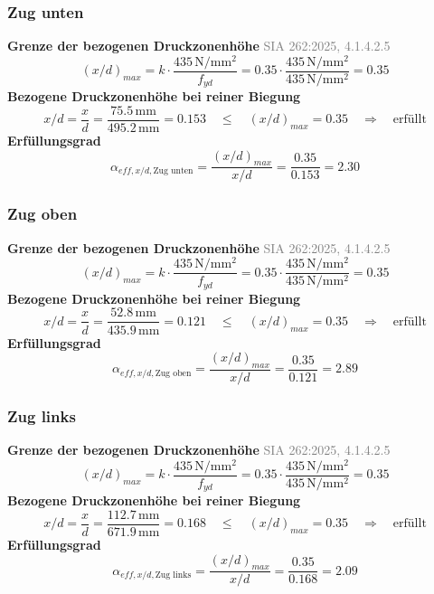 \documentclass[11pt,a4paper]{article}
\newcommand{\normref}[1]{{\small\textcolor{gray}{#1}}}
\begin{document}
\subsubsection{Zug unten}
\noindent\textbf{Grenze der bezogenen Druckzonenhöhe} \hfill \normref{SIA 262:2025, 4.1.4.2.5}
\begin{equation*}
\left(x/d\right)_{max} = k \cdot \frac{435\,\mathrm{N/mm^2}}{f_{yd}} = 0.35 \cdot \frac{435\,\mathrm{N/mm^2}}{435\,\mathrm{N}/\mathrm{mm}^{2}} = 0.35
\end{equation*}
\noindent\textbf{Bezogene Druckzonenhöhe bei reiner Biegung}
\begin{equation*}
x/d = \frac{x}{d} = \frac{75.5\,\mathrm{mm}}{495.2\,\mathrm{mm}} = 0.153 \quad \le \quad \left(x/d\right)_{max} = 0.35 \quad \Rightarrow \quad \text{erfüllt}
\end{equation*}
\noindent\textbf{Erfüllungsgrad}
\begin{equation*}
\alpha_{eff,x/d,\text{Zug unten}} = \frac{\left(x/d\right)_{max}}{x/d} = \frac{0.35}{0.153} = 2.30
\end{equation*}
\subsubsection{Zug oben}
\noindent\textbf{Grenze der bezogenen Druckzonenhöhe} \hfill \normref{SIA 262:2025, 4.1.4.2.5}
\begin{equation*}
\left(x/d\right)_{max} = k \cdot \frac{435\,\mathrm{N/mm^2}}{f_{yd}} = 0.35 \cdot \frac{435\,\mathrm{N/mm^2}}{435\,\mathrm{N}/\mathrm{mm}^{2}} = 0.35
\end{equation*}
\noindent\textbf{Bezogene Druckzonenhöhe bei reiner Biegung}
\begin{equation*}
x/d = \frac{x}{d} = \frac{52.8\,\mathrm{mm}}{435.9\,\mathrm{mm}} = 0.121 \quad \le \quad \left(x/d\right)_{max} = 0.35 \quad \Rightarrow \quad \text{erfüllt}
\end{equation*}
\noindent\textbf{Erfüllungsgrad}
\begin{equation*}
\alpha_{eff,x/d,\text{Zug oben}} = \frac{\left(x/d\right)_{max}}{x/d} = \frac{0.35}{0.121} = 2.89
\end{equation*}
\subsubsection{Zug links}
\noindent\textbf{Grenze der bezogenen Druckzonenhöhe} \hfill \normref{SIA 262:2025, 4.1.4.2.5}
\begin{equation*}
\left(x/d\right)_{max} = k \cdot \frac{435\,\mathrm{N/mm^2}}{f_{yd}} = 0.35 \cdot \frac{435\,\mathrm{N/mm^2}}{435\,\mathrm{N}/\mathrm{mm}^{2}} = 0.35
\end{equation*}
\noindent\textbf{Bezogene Druckzonenhöhe bei reiner Biegung}
\begin{equation*}
x/d = \frac{x}{d} = \frac{112.7\,\mathrm{mm}}{671.9\,\mathrm{mm}} = 0.168 \quad \le \quad \left(x/d\right)_{max} = 0.35 \quad \Rightarrow \quad \text{erfüllt}
\end{equation*}
\noindent\textbf{Erfüllungsgrad}
\begin{equation*}
\alpha_{eff,x/d,\text{Zug links}} = \frac{\left(x/d\right)_{max}}{x/d} = \frac{0.35}{0.168} = 2.09
\end{equation*}
\end{document}
